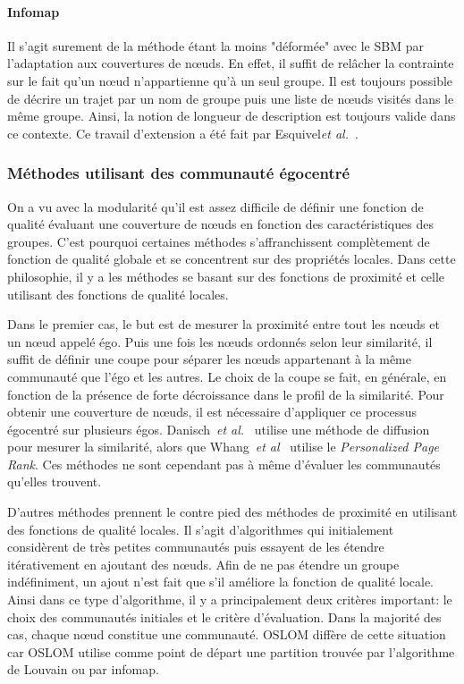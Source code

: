 \paragraph{Infomap}
Il s'agit surement de la méthode étant la moins "déformée" avec le SBM par l'adaptation aux couvertures de n\oe uds.
En effet, il suffit de relâcher la contrainte sur le fait qu'un n\oe ud n'appartienne qu'à un seul groupe.
Il est toujours possible de décrire un trajet par un nom de groupe puis une liste de n\oe uds visités dans le même groupe.
Ainsi, la notion de longueur de description est toujours valide dans ce contexte.
Ce travail d'extension a été fait par Esquivel\emph{et al.}~\cite{Esquivel2011}.

\subsubsection{Méthodes utilisant des communauté égocentré}
On a vu avec la modularité qu'il est assez difficile de définir une fonction de qualité évaluant une couverture de n\oe uds en fonction des caractéristiques des groupes.
C'est pourquoi certaines méthodes s'affranchissent complètement de fonction de qualité globale et se concentrent sur des propriétés locales.
Dans cette philosophie, il y a les méthodes se basant sur des fonctions de proximité et celle utilisant des fonctions de qualité locales.

Dans le premier cas, le but est de mesurer la proximité entre tout les n\oe uds et un n\oe ud appelé égo.
Puis une fois les n\oe uds ordonnés selon leur similarité, il suffit de définir une coupe pour séparer les n\oe uds appartenant à la même communauté que l'égo et les autres.
Le choix de la coupe se fait, en générale, en fonction de la présence de forte décroissance dans le profil de la similarité.
Pour obtenir une couverture de n\oe uds, il est nécessaire d'appliquer ce processus égocentré sur plusieurs égos.
Danisch~\emph{et al.}~\cite{Danisch2012} utilise une méthode de diffusion pour mesurer la similarité, alors que Whang~\emph{et al}~\cite{Whang2013} utilise le \emph{Personalized Page Rank}.
Ces méthodes ne sont cependant pas à même d'évaluer les communautés qu'elles trouvent.
\bigskip

D'autres méthodes prennent le contre pied des méthodes de proximité en utilisant des fonctions de qualité locales.
Il s'agit d'algorithmes qui initialement considèrent de très petites communautés puis essayent de les étendre itérativement en ajoutant des n\oe uds.
Afin de ne pas étendre un groupe indéfiniment, un ajout n'est fait que s'il améliore la fonction de qualité locale.
Ainsi dans ce type d'algorithme, il y a principalement deux critères important:
le choix des communautés initiales et le critère d'évaluation.
Dans la majorité des cas, chaque n\oe ud constitue une communauté. 
OSLOM\cite{Lancichinetti2011a} diffère de cette situation car OSLOM utilise comme point de départ une partition trouvée par l'algorithme de Louvain ou par infomap.


